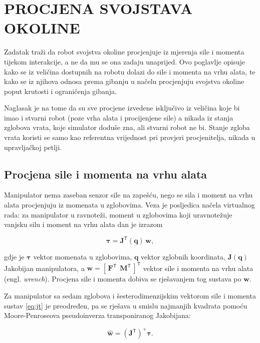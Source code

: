 \chapter{PROCJENA SVOJSTAVA OKOLINE}
\label{ch:procjena}

Zadatak traži da robot svojstva okoline procjenjuje iz mjerenja sile i momenta tijekom
interakcije, a ne da mu se ona zadaju unaprijed. Ovo poglavlje opisuje kako se iz veličina
dostupnih na robotu dolazi do sile i momenta na vrhu alata, te kako se iz njihova odnosa prema
gibanju u načelu procjenjuju svojstva okoline poput krutosti i ograničenja gibanja.

Naglasak je na tome da su sve procjene izvedene isključivo iz veličina koje bi imao i stvarni
robot (poze vrha alata i procijenjene sile) a nikada iz stanja zglobova vrata, koje
simulator doduše zna, ali stvarni robot ne bi. Stanje zgloba vrata koristi se samo kao
referentna vrijednost pri provjeri procjenitelja, nikada u upravljačkoj petlji.

\section{Procjena sile i momenta na vrhu alata}
\label{sec:wrench}

Manipulator nema zaseban senzor sile na zapešću, nego se sila i moment na vrhu alata procjenjuju
iz momenata u zglobovima. Veza je posljedica načela virtualnog rada: za manipulator u ravnoteži,
moment u zglobovima koji uravnotežuje vanjsku silu i moment na vrhu alata dan je izrazom

\begin{equation}
    \bm{\tau} = \bm{J}^{\mathsf{T}}(\bm{q})\,\bm{w} ,
    \label{eq:jt}
\end{equation}

gdje je $\bm{\tau}$ vektor momenata u zglobovima, $\bm{q}$ vektor zglobnih koordinata,
$\bm{J}(\bm{q})$ Jakobijan manipulatora, a $\bm{w} = [\,\bm{F}^{\mathsf{T}} \ \
        \bm{M}^{\mathsf{T}}\,]^{\mathsf{T}}$ vektor sile i momenta na vrhu alata (engl. \textit{wrench}).
Procjena sile i momenta dobiva se rješavanjem tog sustava po $\bm{w}$.

Za manipulator sa sedam zglobova i šesterodimenzijskim vektorom sile i momenta sustav
\eqref{eq:jt} je preodređen, pa se rješava u smislu najmanjih kvadrata pomoću
Moore-Penroseova pseudoinverza transponiranog Jakobijana:

\begin{equation}
    \hat{\bm{w}} = \left( \bm{J}^{\mathsf{T}} \right)^{+} \bm{\tau} .
    \label{eq:wrench-est}
\end{equation}

